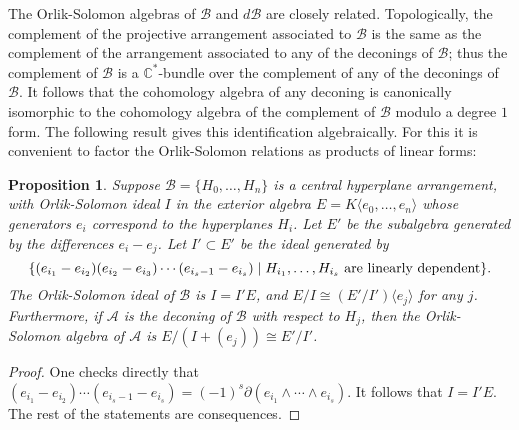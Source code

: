 \documentclass{tran-l}
\newtheorem{proposition}[theorem]{Proposition}
\theoremstyle{definition}
\theoremstyle{remark}
\newcommand{\CC}{{\mathbb{C}}}
\newcommand{\Acal}{{{\mathcal A}}}
\newcommand{\B}{{\mathcal B}}
\begin{document}
The Orlik-Solomon algebras
of $\B$ and $d\B$ are closely related. Topologically,
the complement of
the projective arrangement associated to $\B$ is the same as the
complement of the arrangement associated to any of the deconings of $\B$;
thus the complement of $\B$ is a $\CC^*$-bundle over the 
complement of any of the deconings of $\B$. It follows
that the cohomology algebra of any deconing is
canonically isomorphic to the cohomology algebra of the
complement of $\B$ modulo a degree $1$ form.
The following result gives this identification
algebraically. For
this it is convenient to factor the Orlik-Solomon
relations as products of linear forms:

\begin{proposition}\label{deconing}
 Suppose $\B=\{H_0,\dots,H_n\}$ 
is a central hyperplane arrangement, 
with Orlik-Solomon ideal $I$ in the exterior algebra
$E=K\langle e_0,\dots,e_n\rangle$ whose generators
$e_i$ correspond to the hyperplanes $H_i$. 
Let $E'$ be the subalgebra generated by the differences
$e_i-e_j$. Let $I'\subset E'$ be 
the ideal generated by
\[
\{ (e_{i_1}-e_{i_2})(e_{i_2}-e_{i_3})
\cdots(e_{i_s-1}-e_{i_s})\mid
H_{i_1},\dots,H_{i_s}\hbox{\ are linearly dependent}\}.
\]
The Orlik-Solomon ideal of $\B$ is $I=I'E$, and
$E/I\cong (E'/I')\langle e_j\rangle$ for any $j$. Furthermore,
if $\Acal$ is the deconing of $\B$ with respect to
$H_j$, then the Orlik-Solomon algebra of $\Acal$ is 
$E/(I+(e_j))\cong E'/I'$.
\end{proposition}

\begin{proof} One checks directly that
$
(e_{i_1}-e_{i_2})\cdots(e_{i_s-1}-e_{i_s})= 
{(-1)}^s\partial(e_{i_1}\wedge\cdots\wedge e_{i_s}).
$
It follows that $I=I'E$. The rest
of the statements are consequences.\end{proof}
   
\end{document}
